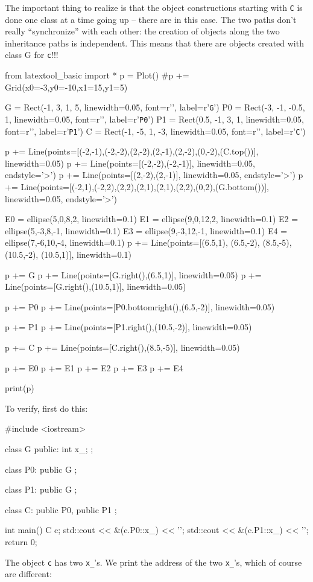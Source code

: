 The important thing to realize is that the object constructions starting
with \verb!C! is done one class at a time going up -- there are
 in this case. The two paths don't really
``synchronize'' with each other: the creation of objects along the two
inheritance paths is independent. This means that there are 
objects created with class G for \verb!c!!!!
\begin{python}
from latextool_basic import *
p = Plot()
#p += Grid(x0=-3,y0=-10,x1=15,y1=5)

G = Rect(-1, 3, 1, 5, linewidth=0.05, font=r'\huge', label=r'\texttt{G}')
P0 = Rect(-3, -1, -0.5, 1, linewidth=0.05, font=r'\huge', label=r'\texttt{P0}')
P1 = Rect(0.5, -1, 3, 1, linewidth=0.05, font=r'\huge', label=r'\texttt{P1}')
C = Rect(-1, -5, 1, -3, linewidth=0.05, font=r'\huge', label=r'\texttt{C}')

p += Line(points=[(-2,-1),(-2,-2),(2,-2),(2,-1),(2,-2),(0,-2),(C.top())], linewidth=0.05)
p += Line(points=[(-2,-2),(-2,-1)], linewidth=0.05, endstyle='>')
p += Line(points=[(2,-2),(2,-1)], linewidth=0.05, endstyle='>')
p += Line(points=[(-2,1),(-2,2),(2,2),(2,1),(2,1),(2,2),(0,2),(G.bottom())], linewidth=0.05, endstyle='>')

E0 = ellipse(5,0,8,2, linewidth=0.1)
E1 = ellipse(9,0,12,2, linewidth=0.1)
E2 = ellipse(5,-3,8,-1, linewidth=0.1)
E3 = ellipse(9,-3,12,-1, linewidth=0.1)
E4 = ellipse(7,-6,10,-4, linewidth=0.1)
p += Line(points=[(6.5,1), (6.5,-2), (8.5,-5), (10.5,-2), (10.5,1)], linewidth=0.1)

p += G
p += Line(points=[G.right(),(6.5,1)], linewidth=0.05)
p += Line(points=[G.right(),(10.5,1)], linewidth=0.05)

p += P0
p += Line(points=[P0.bottomright(),(6.5,-2)], linewidth=0.05)

p += P1
p += Line(points=[P1.right(),(10.5,-2)], linewidth=0.05)

p += C
p += Line(points=[C.right(),(8.5,-5)], linewidth=0.05)


p += E0
p += E1
p += E2
p += E3
p += E4

print(p)
\end{python}

To verify, first do this:
\begin{console}
#include <iostream>

class G
{
public:
        int x_;
};

class P0: public G
{};

class P1: public G
{};

class C: public P0, public P1
{};

int main()
{   
    C c;
    std::cout << &(c.P0::x_) << '\n';
    std::cout << &(c.P1::x_) << '\n';
    return 0;
}
\end{console}
The object \verb!c! has two \verb!x_!'s. We print the address of the
two \verb!x_!'s, which of course are different:

